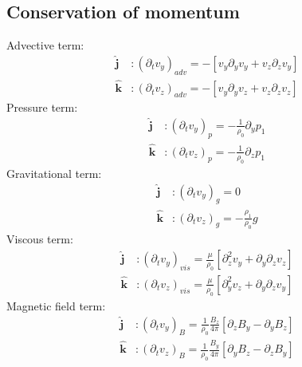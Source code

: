 \documentclass{article}
\begin{document}
\subsection{Conservation of momentum}
Advective term:\\
\begin{align}
    \mathbf{\hat{j}} &: (\partial_t v_y)_{adv} = - \left[ v_y\partial_y v_y + v_z\partial_z v_y \right]\\
    \mathbf{\hat{k}} &: (\partial_t v_z)_{adv} = - \left[ v_y\partial_y v_z + v_z\partial_z v_z \right]
\end{align}
Pressure term:\\
\begin{align}
    \mathbf{\hat{j}} &: (\partial_t v_y)_{p} = - \frac{1}{\rho_0} \partial_y p_1\\
    \mathbf{\hat{k}} &: (\partial_t v_z)_{p} = - \frac{1}{\rho_0}\partial_z p_1
\end{align}
Gravitational term:\\
\begin{align}
    \mathbf{\hat{j}} &: (\partial_t v_y)_{g} = 0\\
    \mathbf{\hat{k}} &: (\partial_t v_z)_{g} = - \frac{\rho_1}{\rho_0} g
\end{align}
Viscous term:\\
\begin{align}
    \mathbf{\hat{j}} &: (\partial_t v_y)_{vis} = \frac{\mu}{\rho_0}\left[ \partial_z^2 v_y + \partial_y\partial_z v_z  \right]\\
    \mathbf{\hat{k}} &: (\partial_t v_z)_{vis} = \frac{\mu}{\rho_0}\left[ \partial_y^2 v_z + \partial_y\partial_z v_y \right]
\end{align}
Magnetic field term:\\
\begin{align}
    \mathbf{\hat{j}} &: (\partial_t v_y)_{B} = \frac{1}{\rho_0}\frac{B_z}{4\pi}\left[ \partial_z B_y - \partial_y B_z \right]\\
    \mathbf{\hat{k}} &: (\partial_t v_z)_{B} = \frac{1}{\rho_0}\frac{B_y}{4\pi}\left[\partial_y B_z - \partial_z B_y   \right]
\end{align}
\end{document}
